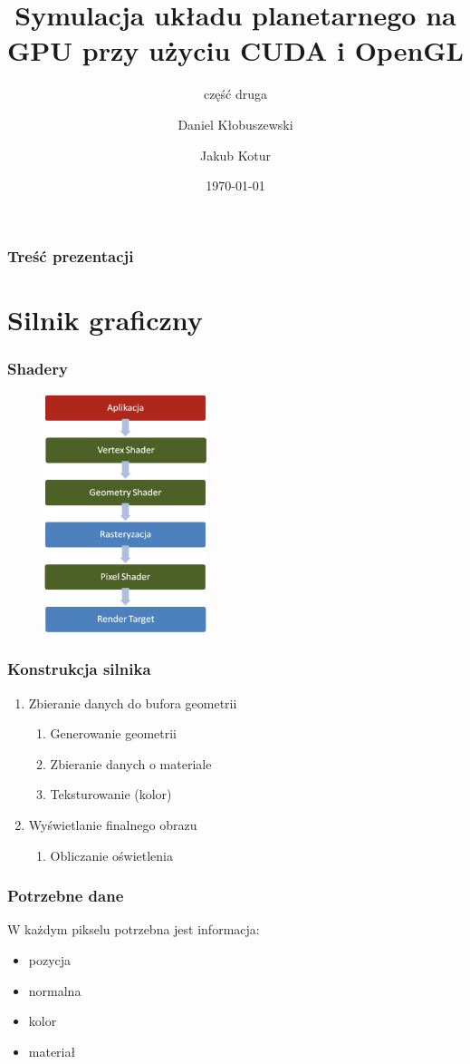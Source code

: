 \documentclass{beamer}
\title{Symulacja układu planetarnego na GPU przy użyciu CUDA i OpenGL}
\subtitle{część druga}
\author{Daniel Kłobuszewski\and Jakub Kotur}
\institute{{\normalsize Promotor: Krzysztof Kaczmarski}\\\vspace{1cm} Politechnika Warszawska}
\date{\today}
\begin{document}
\frame[plain]{\titlepage}

\frame
{
	\frametitle{Treść prezentacji}
	\tableofcontents
}

\section{Silnik graficzny}\label{sec:silnik graficzny}

\frame
{
	\frametitle{Shadery}
	\begin{figure}
	\centering
		\includegraphics[height=7cm]{img/potok.png}
	\end{figure}
	\setcounter{subfigure}{0}
}

\frame
{
	\frametitle{Konstrukcja silnika}

	\begin{enumerate}
	\item Zbieranie danych do bufora geometrii
		\begin{enumerate}
		\item Generowanie geometrii
		\item Zbieranie danych o materiale
		\item Teksturowanie (kolor)
		\end{enumerate}
	\item Wyświetlanie finalnego obrazu
		\begin{enumerate}
		\item Obliczanie oświetlenia
		\end{enumerate}
	\end{enumerate}
}

\frame
{
	\frametitle{Potrzebne dane}

	W każdym pikselu potrzebna jest informacja:

	\begin{itemize}
	\item pozycja 
	\item normalna
	\item kolor
	\item materiał
	\end{itemize}
}
\end{document}
